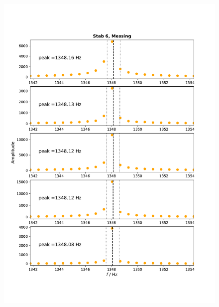 \documentclass[a4paper, 12pt]{scrartcl}
\begin{document}
\begin{figure}[H]
	\centering
	\includegraphics[width=\linewidth]{plots/anhang2.pdf}
\end{figure}
\end{document}
